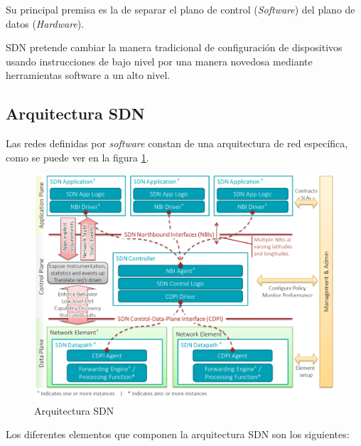 Su principal premisa es la de separar el plano de control (\textit{Software}) del plano de datos (\textit{Hardware}).

SDN pretende cambiar la manera tradicional de configuración de dispositivos usando instrucciones de bajo nivel por una manera novedosa mediante herramientas software a un alto nivel.

\subsection{Arquitectura SDN}

Las redes definidas por \textit{software} constan de una arquitectura de red específica, como se puede ver en la figura \ref{fig:arquitecturasdn}.
 
\begin{figure}[!ht]
	\centering
	\includegraphics[width=0.8\linewidth]{imagenes/arquitectura_sdn}
	\caption{Arquitectura SDN}
	\label{fig:arquitecturasdn}
\end{figure}

Los diferentes elementos que componen la arquitectura SDN son los siguientes:

